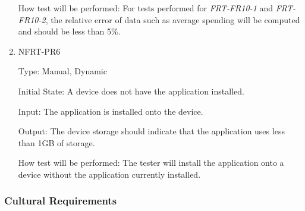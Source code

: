 \documentclass[12pt, titlepage]{article}
\begin{document}
\begin{enumerate}
  How test will be performed: For tests performed for \textit{FRT-FR10-1} and \textit{FRT-FR10-2}, the relative
  error of data such as average spending will be computed and should be less than 5\%.

  \item{NFRT-PR6\\}

  Type: Manual, Dynamic

  Initial State: A device does not have the application installed.

  Input: The application is installed onto the device.

  Output: The device storage should indicate that the application uses less than 1GB of storage.

  How test will be performed: The tester will install the application onto a device without the application currently
  installed.
\end{enumerate}

\subsubsection{Cultural Requirements}
\end{document}
